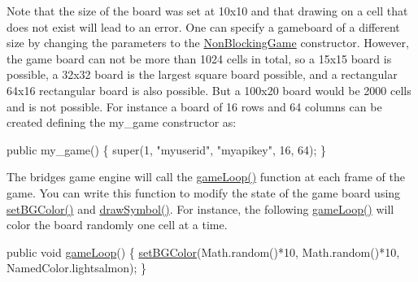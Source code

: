 Note that the size of the board was set at 10x10 and that drawing on a cell that does not exist will lead to an error. One can specify a gameboard of a different size by changing the parameters to the \hyperlink{classbridges_1_1games_1_1_non_blocking_game}{Non\+Blocking\+Game} constructor. However, the game board can not be more than 1024 cells in total, so a 15x15 board is possible, a 32x32 board is the largest square board possible, and a rectangular 64x16 rectangular board is also possible. But a 100x20 board would be 2000 cells and is not possible. For instance a board of 16 rows and 64 columns can be created defining the my\+\_\+game constructor as\+:


\begin{DoxyCode}
\textcolor{keyword}{public} my\_game() \{ super(1, \textcolor{stringliteral}{"myuserid"},  \textcolor{stringliteral}{"myapikey"}, 16, 64); \}
\end{DoxyCode}


The bridges game engine will call the \hyperlink{classbridges_1_1games_1_1_game_base_a56d05ed744791cfc1c3792f39ff438f1}{game\+Loop()} function at each frame of the game. You can write this function to modify the state of the game board using \hyperlink{classbridges_1_1games_1_1_game_base_ac9a231dd4425eb0f9dea2377653b23c4}{set\+B\+G\+Color()} and \hyperlink{classbridges_1_1games_1_1_game_base_a7dd4caecd0522dcf7fc275517fbc695d}{draw\+Symbol()}. For instance, the following \hyperlink{classbridges_1_1games_1_1_game_base_a56d05ed744791cfc1c3792f39ff438f1}{game\+Loop()} will color the board randomly one cell at a time.


\begin{DoxyCode}
\textcolor{keyword}{public} \textcolor{keywordtype}{void} \hyperlink{classbridges_1_1games_1_1_game_base_a56d05ed744791cfc1c3792f39ff438f1}{gameLoop}() \{
  \hyperlink{classbridges_1_1games_1_1_game_base_ac9a231dd4425eb0f9dea2377653b23c4}{setBGColor}(Math.random()*10, Math.random()*10, NamedColor.lightsalmon);
\}
\end{DoxyCode}


